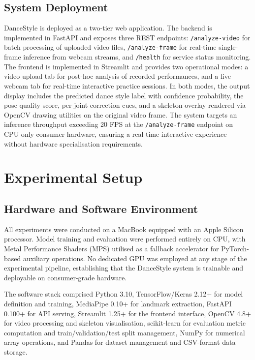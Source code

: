 \documentclass[journal]{IEEEtran}
\begin{document}
\subsection{System Deployment}

DanceStyle is deployed as a two-tier web application. The backend
is implemented in FastAPI and exposes three REST endpoints:
\texttt{/analyze-video} for batch processing of uploaded video files,
\texttt{/analyze-frame} for real-time single-frame inference from
webcam streams, and \texttt{/health} for service status monitoring.
The frontend is implemented in Streamlit and provides two operational
modes: a video upload tab for post-hoc analysis of recorded performances,
and a live webcam tab for real-time interactive practice sessions.
In both modes, the output display includes the predicted dance style
label with confidence probability, the pose quality score, per-joint
correction cues, and a skeleton overlay rendered via OpenCV drawing
utilities on the original video frame. The system targets an inference
throughput exceeding 20 FPS at the \texttt{/analyze-frame} endpoint
on CPU-only consumer hardware, ensuring a real-time interactive
experience without hardware specialisation requirements.

\section{Experimental Setup}
\label{sec:setup}

\subsection{Hardware and Software Environment}

All experiments were conducted on a MacBook equipped with an Apple
Silicon processor. Model training and evaluation were performed
entirely on CPU, with Metal Performance Shaders (MPS) utilised as a
fallback accelerator for PyTorch-based auxiliary operations. No
dedicated GPU was employed at any stage of the experimental pipeline,
establishing that the DanceStyle system is trainable and deployable
on consumer-grade hardware.

The software stack comprised Python 3.10, TensorFlow/Keras 2.12+
for model definition and training, MediaPipe 0.10+ for landmark
extraction, FastAPI 0.100+ for API serving, Streamlit 1.25+ for the
frontend interface, OpenCV 4.8+ for video processing and skeleton
visualisation, scikit-learn for evaluation metric computation and
train/validation/test split management, NumPy for numerical array
operations, and Pandas for dataset management and CSV-format data
storage.
\end{document}

